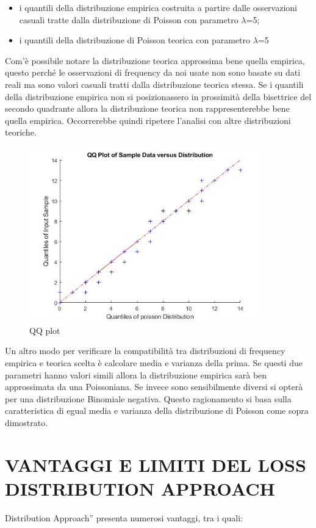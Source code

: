 \documentclass[titlepage]{article}
\begin{document}
\begin{itemize}
\begin{itemize}
	\item i quantili della distribuzione empirica costruita a partire dalle osservazioni casuali tratte dalla distribuzione di Poisson con parametro $\lambda$=5;
	\item 	i quantili della distribuzione di Poisson teorica con parametro $\lambda$=5
\end{itemize}
Com’è possibile notare la distribuzione teorica approssima bene quella empirica, questo perché le osservazioni di frequency da noi usate non sono basate su dati reali ma sono valori casuali tratti dalla distribuzione teorica stessa.
Se i quantili della distribuzione empirica non si posizionassero in prossimità della bisettrice del secondo quadrante allora la distribuzione teorica non rappresenterebbe bene quella empirica. Occorrerebbe quindi ripetere l’analisi con altre distribuzioni teoriche.
\begin{figure}[htbp]
	\centering
	\includegraphics[width=0.9\textwidth]{QQPLOT.jpg}
	\caption{\label{fig:losss.png}QQ plot}
\end{figure}
Un altro modo per verificare la compatibilità tra distribuzioni di frequency empirica e teorica scelta è calcolare media e varianza della prima. Se questi due parametri hanno valori simili allora la distribuzione empirica sarà ben approssimata da una Poissoniana. Se invece sono sensibilmente diversi si opterà per una distribuzione Binomiale negativa. Questo ragionamento si basa sulla caratteristica di egual media e varianza della distribuzione di Poisson come sopra dimostrato.
\newpage
\newpage
\section{VANTAGGI E LIMITI DEL LOSS DISTRIBUTION APPROACH}
Distribution Approach” presenta numerosi vantaggi, tra i quali: 
\begin{itemize}



\end{itemize}
\end{itemize}
\end{document}
